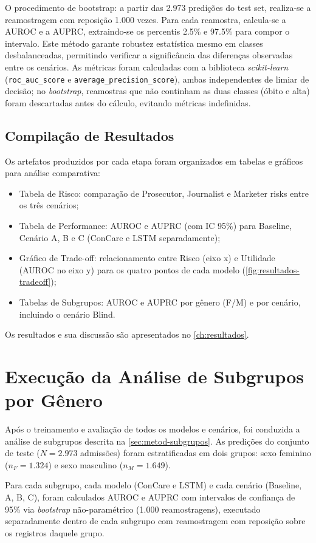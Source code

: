 O procedimento de bootstrap: a partir das 2.973 predições do test set, realiza-se a reamostragem com reposição 1.000 vezes. Para cada reamostra, calcula-se a AUROC e a AUPRC, extraindo-se os percentis 2.5\% e 97.5\% para compor o intervalo. Este método garante robustez estatística mesmo em classes desbalanceadas, permitindo verificar a significância das diferenças observadas entre os cenários. As métricas foram calculadas com a biblioteca \textit{scikit-learn} (\texttt{roc\_auc\_score} e \texttt{average\_precision\_score}), ambas independentes de limiar de decisão; no \textit{bootstrap}, reamostras que não continham as duas classes (óbito e alta) foram descartadas antes do cálculo, evitando métricas indefinidas.

\subsection{Compilação de Resultados}
Os artefatos produzidos por cada etapa foram organizados em tabelas e gráficos para análise comparativa:
\begin{itemize}
    \item Tabela de Risco: comparação de Prosecutor, Journalist e Marketer risks entre os três cenários;
    \item Tabela de Performance: AUROC e AUPRC (com IC 95\%) para Baseline, Cenário A, B e C (ConCare e LSTM separadamente);
    \item Gráfico de Trade-off: relacionamento entre Risco (eixo x) e Utilidade (AUROC no eixo y) para os quatro pontos de cada modelo (\autoref{fig:resultados-tradeoff});
    \item Tabelas de Subgrupos: AUROC e AUPRC por gênero (F/M) e por cenário, incluindo o cenário Blind.
\end{itemize}

Os resultados e sua discussão são apresentados no \autoref{ch:resultados}.

\section{Execução da Análise de Subgrupos por Gênero}
\label{sec:dev-subgrupos}

Após o treinamento e avaliação de todos os modelos e cenários, foi conduzida a análise de subgrupos descrita na \autoref{sec:metod-subgrupos}. As predições do conjunto de teste ($N = 2.973$ admissões) foram estratificadas em dois grupos: sexo feminino ($n_F = 1.324$) e sexo masculino ($n_M = 1.649$).

Para cada subgrupo, cada modelo (ConCare e LSTM) e cada cenário (Baseline, A, B, C), foram calculados AUROC e AUPRC com intervalos de confiança de 95\% via \textit{bootstrap} não-paramétrico (1.000 reamostragens), executado separadamente dentro de cada subgrupo com reamostragem com reposição sobre os registros daquele grupo.

